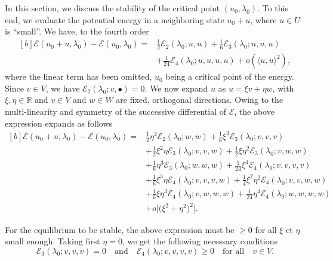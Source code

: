 \documentclass[12pt, final]{scrartcl}
\theoremstyle{definition}
\newcommand{\E}{\mathcal E}
\newcommand{\reals}{\mathbb{R}}
\begin{document}
In this section, we discuss the stability of the critical point $(u_0, \lambda_0)$. To
this end, we evaluate the potential energy in a neighboring state
$u_0 + u$, where $u \in U$ is ``small''. We have, to the fourth order
\begin{equation}
  \begin{aligned}[b]
    \E(u_0 + u, \lambda_0) - \E(u_0, \lambda_0) ={}
    &\tfrac{1}{2} \E_2(\lambda_0; u, u) + \tfrac{1}{6} \E_3(\lambda_0; u, u, u)\\
    &+ \tfrac{1}{24} \E_4(\lambda_0; u, u, u, u) + o(〈 u , u 〉^2),
  \end{aligned}
\end{equation}
where the linear term has been omitted, $u_0$ being a critical point of the
energy. Since $v \in V$, we have $\E_2(\lambda_0; v, •) = 0$. We now expand $u$ as
$u = ξ v + η w$, with $ξ, η \in \reals$ and $v \in V$ and $w \in W$ are fixed,
orthogonal directions. Owing to the multi-linearity and symmetry of the
successive differential of $\E$, the above expression expands as
follows
\begin{equation}
  \begin{aligned}[b]
    \E(u_0 + u, \lambda_0) - \E(u_0, \lambda_0) ={}
    & \tfrac{1}{2} η^2 \E_2(\lambda_0; w, w) + \tfrac{1}{6} ξ^3 \E_3(\lambda_0; v, v, v)\\
    & + \tfrac{1}{2} ξ^2 η \E_3(\lambda_0; v, v, w) + \tfrac{1}{2} ξ η^2 \E_3(\lambda_0; v, w, w)\\
    & + \tfrac{1}{6} η^3 \E_3(\lambda_0; w, w, w) + \tfrac{1}{24} ξ^4 \E_4(\lambda_0; v, v, v, v)\\
    & + \tfrac{1}{6} ξ^3 η \E_4(\lambda_0; v, v, v, w) + \tfrac{1}{4} ξ^2 η^2 \E_4(\lambda_0; v, v, w, w)\\
    & + \tfrac{1}{6} ξ η^3 \E_4(\lambda_0; v, w, w, w) + \tfrac{1}{24} η^4 \E_4(\lambda_0; w, w, w, w)\\
    & + o\bigl[\bigl(ξ^2 + η^2\bigr)^2\bigr].
  \end{aligned}
\end{equation}

For the equilibrium to be stable, the above expression must be $≥ 0$ for all
$ξ$ et $η$ small enough. Taking first $η = 0$, we get the following necessary conditions
\begin{equation}
  \label{eq:20211108164416}
  \E_3(\lambda_0; v, v, v) = 0 \quad \text{and} \quad \E_4(\lambda_0; v, v, v, v) \geq 0 \quad \text{for all} \quad v \in V.
\end{equation}
\end{document}
